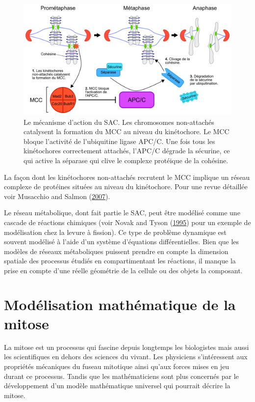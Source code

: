 \documentclass[12pt,a4paper,twoside,openright]{book}
\begin{document}
\begin{figure}[htbp]
\centering
\includegraphics{figures/intro/sac.png}
\caption[Le mécanisme d'action du SAC]{\label{fig:sac}Le mécanisme
d'action du SAC. Les chromosomes non-attachés catalysent la formation du
MCC au niveau du kinétochore. Le MCC bloque l'activité de l'ubiquitine
ligase APC/C. Une fois tous les kinétochores correctement attachés,
l'APC/C dégrade la sécurine, ce qui active la séparase qui clive le
complexe protéique de la cohésine.}
\end{figure}

La façon dont les kinétochores non-attachés recrutent le MCC implique un
réseau complexe de protéines situées au niveau du kinétochore. Pour une
revue détaillée voir Musacchio and Salmon
(\hyperref[ref-Musacchio2007]{2007}).

Le réseau métabolique, dont fait partie le SAC, peut être modélisé comme
une cascade de réactions chimiques (voir Novak and Tyson
(\hyperref[ref-Novak1995]{1995}) pour un exemple de modélisation chez la
levure à fission). Ce type de problème dynamique est souvent modélisé à
l'aide d'un système d'équations différentielles. Bien que les modèles de
réseaux métaboliques puissent prendre en compte la dimension spatiale
des processus étudiés en compartimentant les réactions, il manque la
prise en compte d'une réelle géométrie de la cellule ou des objets la
composant.

\section{Modélisation mathématique de la
mitose}\label{moduxe9lisation-mathuxe9matique-de-la-mitose}

La mitose est un processus qui fascine depuis longtemps les biologistes
mais aussi les scientifiques en dehors des sciences du vivant. Les
physiciens s'intéressent aux propriétés mécaniques du fuseau mitotique
ainsi qu'aux forces mises en jeu durant ce processus. Tandis que les
mathématiciens sont plus concernés par le développement d'un modèle
mathématique universel qui pourrait décrire la mitose.
\end{document}
